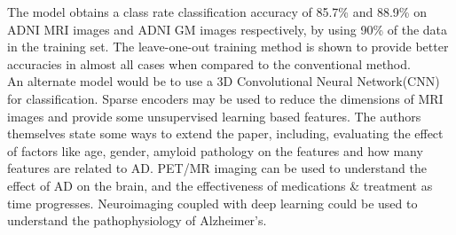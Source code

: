 \documentclass[11pt]{article}
\begin{document}
  The model obtains a class rate classification accuracy of 85.7\%  and 88.9\% on ADNI MRI images and ADNI GM images respectively, by using 90\% of the data in the training set.
  The leave-one-out training method is shown to provide better accuracies in almost all cases when compared to the conventional method.\\

  An alternate model would be to use a 3D Convolutional Neural Network(CNN) for classification. Sparse encoders may be used to reduce the dimensions of MRI images and provide some unsupervised learning based features. The authors themselves state some ways to extend the paper, including, evaluating the effect of factors like age, gender, amyloid pathology on the features and how many features are related to AD.
  PET/MR imaging can be used to understand the effect of AD on the brain, and the effectiveness of medications \& treatment as time progresses. Neuroimaging coupled with deep learning could be used to understand the pathophysiology of Alzheimer's.
\end{document}
